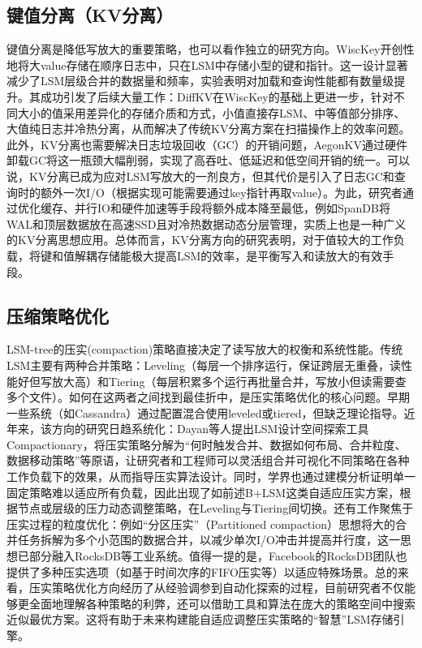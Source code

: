 \documentclass[lang=cn,11pt,a4paper]{elegantpaper}
\begin{document}
\subsection{键值分离（KV分离）}
键值分离是降低写放大的重要策略，也可以看作独立的研究方向。WiscKey开创性地将大value存储在顺序日志中，只在LSM中存储小型的键和指针。这一设计显著减少了LSM层级合并的数据量和频率，实验表明对加载和查询性能都有数量级提升。其成功引发了后续大量工作：DiffKV在WiscKey的基础上更进一步，针对不同大小的值采用差异化的存储介质和方式，小值直接存LSM、中等值部分排序、大值纯日志并冷热分离，从而解决了传统KV分离方案在扫描操作上的效率问题。此外，KV分离也需要解决日志垃圾回收（GC）的开销问题，AegonKV通过硬件卸载GC将这一瓶颈大幅削弱，实现了高吞吐、低延迟和低空间开销的统一。可以说，KV分离已成为应对LSM写放大的一剂良方，但其代价是引入了日志GC和查询时的额外一次I/O（根据实现可能需要通过key指针再取value）。为此，研究者通过优化缓存、并行IO和硬件加速等手段将额外成本降至最低，例如SpanDB将WAL和顶层数据放在高速SSD且对冷热数据动态分层管理，实质上也是一种广义的KV分离思想应用。总体而言，KV分离方向的研究表明，对于值较大的工作负载，将键和值解耦存储能极大提高LSM的效率，是平衡写入和读放大的有效手段。

\subsection{压缩策略优化}
LSM-tree的压实(compaction)策略直接决定了读写放大的权衡和系统性能。传统LSM主要有两种合并策略：Leveling（每层一个排序运行，保证跨层无重叠，读性能好但写放大高）和Tiering（每层积累多个运行再批量合并，写放小但读需要查多个文件）。如何在这两者之间找到最佳折中，是压实策略优化的核心问题。早期一些系统（如Cassandra）通过配置混合使用leveled或tiered，但缺乏理论指导。近年来，该方向的研究日趋系统化：Dayan等人提出LSM设计空间探索工具Compactionary，将压实策略分解为“何时触发合并、数据如何布局、合并粒度、数据移动策略”等原语，让研究者和工程师可以灵活组合并可视化不同策略在各种工作负载下的效果，从而指导压实算法设计。同时，学界也通过建模分析证明单一固定策略难以适应所有负载，因此出现了如前述B+LSM这类自适应压实方案，根据节点或层级的压力动态调整策略，在Leveling与Tiering间切换。还有工作聚焦于压实过程的粒度优化：例如“分区压实”（Partitioned compaction）思想将大的合并任务拆解为多个小范围的数据合并，以减少单次I/O冲击并提高并行度，这一思想已部分融入RocksDB等工业系统。值得一提的是，Facebook的RocksDB团队也提供了多种压实选项（如基于时间次序的FIFO压实等）以适应特殊场景。总的来看，压实策略优化方向经历了从经验调参到自动化探索的过程，目前研究者不仅能够更全面地理解各种策略的利弊，还可以借助工具和算法在庞大的策略空间中搜索近似最优方案。这将有助于未来构建能自适应调整压实策略的“智慧”LSM存储引擎。
\end{document}
